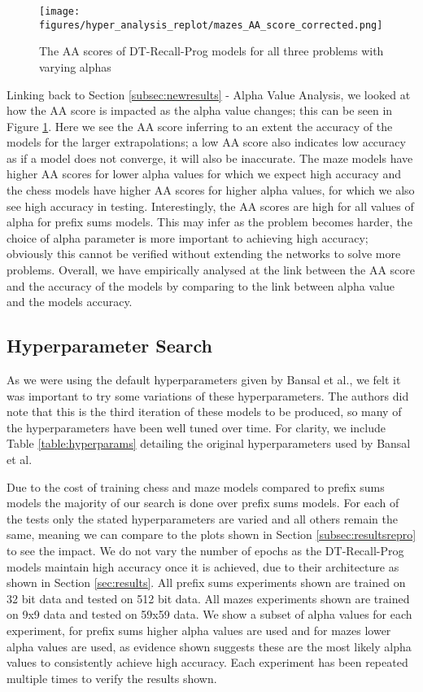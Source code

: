 \begin{figure}[h]
    \centering
    \texttt{[image: figures/hyper\_analysis\_replot/mazes\_AA\_score\_corrected.png]}\hfill
    \\[\smallskipamount]
    \caption{
    The AA scores of DT-Recall-Prog models for all three problems with varying alphas}
    \label{figs:AAscore}
\end{figure}

Linking back to Section \ref{subsec:newresults} - Alpha Value Analysis, we looked at how the AA score is impacted as the alpha value changes; this can be seen in Figure \ref{figs:AAscore}. Here we see the AA score inferring to an extent the accuracy of the models for the larger extrapolations; a low AA score also indicates low accuracy as if a model does not converge, it will also be inaccurate. The maze models have higher AA scores for lower alpha values for which we expect high accuracy and the chess models have higher AA scores for higher alpha values, for which we also see high accuracy in testing. Interestingly, the AA scores are high for all values of alpha for prefix sums models. This may infer as the problem becomes harder, the choice of alpha parameter is more important to achieving high accuracy; obviously this cannot be verified without extending the networks to solve more problems.
Overall, we have empirically analysed at the link between the AA score and the accuracy of the models by comparing to the link between alpha value and the models accuracy.

\subsection{Hyperparameter Search}
\label{sec:hyperparameters}
As we were using the default hyperparameters given by Bansal et al., we felt it was important to try some variations of these hyperparameters. The authors did note that this is the third iteration of these models to be produced, so many of the hyperparameters have been well tuned over time. For clarity, we include Table \ref{table:hyperparams} detailing the original hyperparameters used by Bansal et al.

Due to the cost of training chess and maze models compared to prefix sums models the majority of our search is done over prefix sums models. For each of the tests only the stated hyperparameters are varied and all others remain the same, meaning we can compare to the plots shown in Section \ref{subsec:resultsrepro} to see the impact. We do not vary the number of epochs as the DT-Recall-Prog models maintain high accuracy once it is achieved, due to their architecture as shown in Section \ref{sec:results}. All prefix sums experiments shown are trained on 32 bit data and tested on 512 bit data. All mazes experiments shown are trained on 9x9 data and tested on 59x59 data. We show a subset of alpha values for each experiment, for prefix sums higher alpha values are used and for mazes lower alpha values are used, as evidence shown suggests these are the most likely alpha values to consistently achieve high accuracy. Each experiment has been repeated multiple times to verify the results shown. 

